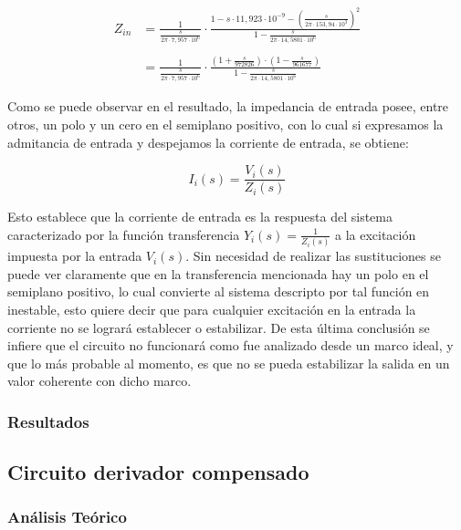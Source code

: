 \begin{align*}
	Z_{in} & = \frac{1}{\frac{s}{2 \pi \cdot 7,957 \cdot 10^{6}}} \cdot
	\frac{1 - s \cdot 11,923 \cdot 10^{-9} - \left(\frac{s}{2 \pi \cdot 153,94 \cdot 10^{3}}\right)^{2}}{1 - \frac{s}{2 \pi \cdot 14,5801 \cdot 10^{6}}} \\
	\\
	& = \frac{1}{\frac{s}{2 \pi \cdot 7,957 \cdot 10^{6}}} \cdot
	\frac{(1 + \frac{s}{972826}) \cdot (1 - \frac{s}{961677})}{1 - \frac{s}{2 \pi \cdot 14,5801 \cdot 10^{6}}}
\end{align*}

Como se puede observar en el resultado, la impedancia de entrada posee, entre otros, un polo y un cero en el semiplano positivo, con lo cual si expresamos la admitancia de entrada y despejamos la corriente de entrada, se obtiene:

\begin{equation}
	I_i(s) = \frac{V_i(s)}{Z_i(s)}
\end{equation}

Esto establece que la corriente de entrada es la respuesta del sistema caracterizado por la funci\'on transferencia $Y_i(s) = \frac{1}{Z_i(s)}$ a la excitaci\'on impuesta por la entrada $V_i(s)$. Sin necesidad de realizar las sustituciones se puede ver claramente que en la transferencia mencionada hay un polo en el semiplano positivo, lo cual convierte al sistema descripto por tal funci\'on en inestable, esto quiere decir que para cualquier excitaci\'on en la entrada la corriente no se lograr\'a establecer o estabilizar. De esta \'ultima conclusi\'on se infiere que el circuito no funcionar\'a como fue analizado desde un marco ideal, y que lo m\'as probable al momento, es que no se pueda estabilizar la salida en un valor coherente con dicho marco.


\subsubsection*{Resultados}


	\subsection*{Circuito derivador compensado}

\subsubsection*{An\'alisis Te\'orico}

